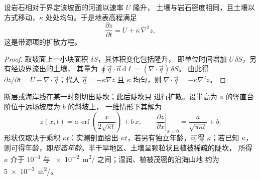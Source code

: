 \begin{theorem}[坡面的扩散]\label{thm:b3:quantitative-geomorphology:diffusion}
设岩石相对于界定该坡面的河道以速率 $U$ 隆升，
土壤与岩石密度相同，且土壤以方式移动，$\kappa$ 处处均匀。于是地表高程满足
\[
\frac{\partial z}{\partial t} = U + \kappa\,\nabla^2 z ,
\]
这是带源项的扩散方程。
\end{theorem}

\begin{proof}
取坡面上一小块面积 $\delta S$，其体积变化包括隆升，
即单位时间增加 $U\,\delta S$，另有经边界流出的土壤，
其量为 $\oint \vec q\cdot\vec n\,\mathrm{d}\ell = (\nabla\cdot\vec q)\,\delta S$。
由此得 $\partial z/\partial t = U - \nabla\cdot\vec q$；代入 $\vec q = -\kappa
\nabla z$ 且 $\kappa$ 均匀，则 $\nabla\cdot\vec q = -\kappa\nabla^2 z$。
\end{proof}

断层或海岸线在某一时刻切出陡坎；此后陡坎只
进行扩散。设半高为 $a$ 的竖直台阶位于远场坡度为 $b$ 的斜坡上，
一维情形下其解为
\[
z(x,t) = a\,\operatorname{erf}\!\left(\frac{x}{2\sqrt{\kappa t}}\right) + b\,x ,
\qquad
\left.\frac{\partial z}{\partial x}\right|_{x=0} = \frac{a}{\sqrt{\pi\kappa t}} + b .
\]
形状仅取决于乘积 $\kappa t$：实测剖面给出
$\kappa t$，若另有独立年龄，可得 $\kappa$；若已知 $\kappa$，
则可得年龄，即\emph{形态年龄}。半干旱地区、土壤呈颗粒状且植被稀疏的陡坎，
所得 $\kappa$ 介于
$10^{-3}$ 与 \qty{e-2}{m^2/} 之间；湿润、植被茂密的沿海山地
约为 \qty{5e-3}{m^2/}。

